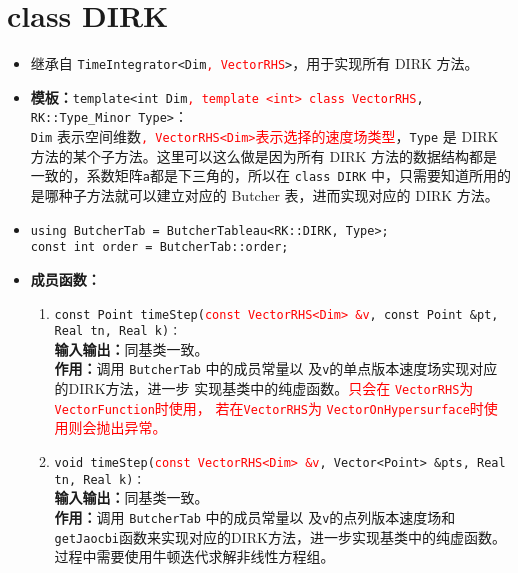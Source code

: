\documentclass[a4paper,twoside]{ctexart}
\begin{document}
\section{class DIRK}
\begin{itemize}
    \item 继承自 \texttt{TimeIntegrator<Dim}\textcolor{red}{\texttt{, VectorRHS}}\texttt{>}，用于实现所有 DIRK 方法。
    \item \textbf{模板：}\texttt{template<int
        Dim}\textcolor{red}{\texttt{, template <int> class
          VectorRHS}}\texttt{, RK::Type\_Minor Type>}：\\\texttt{Dim}
      表示空间维数\textcolor{red}{\texttt{, VectorRHS<Dim>}表示选择的速度场类型}，\texttt{Type} 是 DIRK 方法的某个子方法。这里可以这么做是因为所有 DIRK 方法的数据结构都是一致的，系数矩阵\texttt{a}都是下三角的，所以在 \texttt{class DIRK} 中，只需要知道所用的是哪种子方法就可以建立对应的 Butcher 表，进而实现对应的 DIRK 方法。
    \item \texttt{using ButcherTab = ButcherTableau<RK::DIRK, Type>;\\
    const int order = ButcherTab::order;}
    \item \textbf{成员函数：}
      \begin{enumerate}[(1)]
        \item \texttt{const Point timeStep(}\textcolor{red}{\texttt{const VectorRHS<Dim> \&v}}\texttt{,
            const Point \&pt, Real tn, Real k)：}\\
          \textbf{输入输出：}同基类一致。\\
                \textbf{作用：}调用 \texttt{ButcherTab} 中的成员常量以
                及\texttt{v}的单点版本速度场实现对应的DIRK方法，进一步
                实现基类中的纯虚函数。\textcolor{red}{只会在
                  \texttt{VectorRHS}为\texttt{VectorFunction}时使用，
                  若在\texttt{VectorRHS}为
                  \texttt{VectorOnHypersurface}时使用则会抛出异常。}
                \item \texttt{void timeStep(}\textcolor{red}{\texttt{const VectorRHS<Dim> \&v}}\texttt{, Vector<Point> \&pts, Real tn, Real k)：}\\
                \textbf{输入输出：}同基类一致。\\
                \textbf{作用：}调用 \texttt{ButcherTab} 中的成员常量以
                及\texttt{v}的点列版本速度场和\texttt{getJaocbi}函数来实现对应的DIRK方法，进一步实现基类中的纯虚函数。过程中需要使用牛顿迭代求解非线性方程组。
            \end{enumerate}
\end{itemize}
\end{document}
